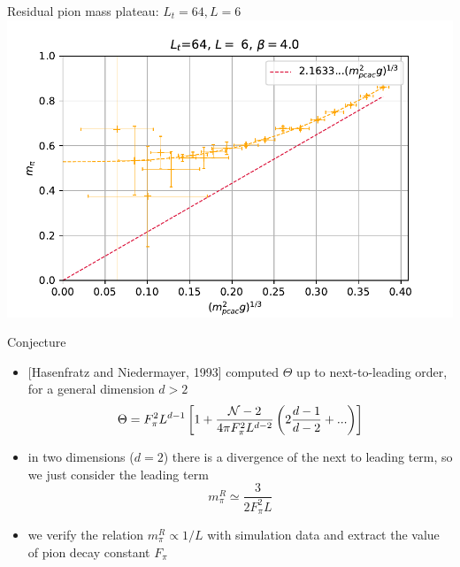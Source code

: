\documentclass[english]{beamer}
\begin{document}
\begin{frame}{Residual pion mass plateau: $L_t = 64, L = 6$}
  \includegraphics[width=1\textwidth]{figs/Mpi6x64Pt10}
\end{frame}

\begin{frame}{Conjecture}
  \begin{itemize}
    \item {[Hasenfratz and Niedermayer, 1993]} computed $\Theta$
      up to next-to-leading order, for a general dimension $d > 2$
            \[
        \Theta = F_\pi^2 L^{d-1} \left[1 +
          \frac{{\cal N} - 2}{4\pi F_\pi^2 L^{d-2}}
          \left(2\frac{d - 1}{d - 2} + ...\right) \right]
      \]
    \item in two dimensions ($d = 2$) there is a divergence of 
      the next to leading term, so we just consider the 
      leading term
      \[
        m_\pi^R \simeq \frac{3}{2F_\pi^2 L}
      \]
    \item we verify the relation $m_\pi^R \propto 1 / L$ with
      simulation data and extract the value of pion decay
      constant $F_\pi$
  \end{itemize}
\end{frame}
\end{document}
